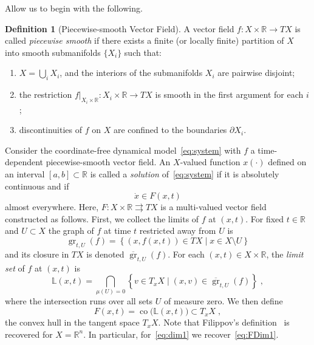 \documentclass{article}
\theoremstyle{definition}
\newtheorem{definition}{Definition}
\theoremstyle{remark}
\newcommand{\MA}{X}	%
\newcommand{\NE}{U}	%
\newcommand{\RR}{\mathbb{R}}	%
\DeclareMathOperator{\co}{co}
\DeclareMathOperator{\gr}{gr}
\begin{document}
Allow us to begin with the following.
\begin{definition}[Piecewise-smooth Vector Field]
 A vector field $f:\MA\times\RR \to T\MA$ is called \emph{piecewise smooth} if there exists 
 a finite (or locally finite) partition of $\MA$ into smooth submanifolds $\{\MA_i\}$ such that:
 \begin{enumerate}
  \item $\MA=\bigcup_i \MA_i$, and the interiors of the submanifolds $\MA_i$ are pairwise disjoint;
  \item the restriction $f\big|_{\MA_i \times \RR}: \MA_i \times \RR \to T\MA$ is smooth in the first argument for each $i$;
  \item discontinuities of $f$ on $\MA$ are confined to the boundaries $\partial \MA_i$.
 \end{enumerate}
\end{definition}

Consider the coordinate-free dynamical model~\eqref{eq:system} with $f$ a time-dependent
piecewise-smooth vector field. An $\MA$-valued function $x(\cdot)$ defined on an interval $[a,b] \subset \RR$ 
is called a \emph{solution} of~\eqref{eq:system} if it is absolutely continuous and if
\begin{equation} \label{eq:F}
 \dot{x} \in F(x,t)
\end{equation}
almost everywhere. Here, $F:\MA \times \RR \rightrightarrows T\MA$ is a multi-valued vector field constructed as follows.
First, we collect the limits of $f$ at $(x,t)$. For fixed $t \in \RR$ and $\NE \subset \MA$ the graph of $f$ at time $t$ restricted away from $\NE$ is
\begin{displaymath}
 \gr_{t,\NE}(f) = \left\{(x,f(x,t)) \in T\MA \mid x \in \MA\setminus\NE \right\}
\end{displaymath}
and its closure in $T\MA$ is denoted $\overline{\gr}_{t,\NE}(f)$. For each $(x,t) \in \MA \times \RR$,
the \emph{limit set} of $f$ at $(x,t)$ is
\begin{displaymath}
 \mathbb{L}(x,t) = \bigcap_{\mu(\NE) = 0} \left\{ v \in T_x \MA \mid (x,v) \in \overline{\gr}_{t,\NE}(f) \right\} \;,
\end{displaymath}
where the intersection runs over all sets $\NE$ of measure zero. We then define
\begin{equation} \label{eq:filippovConv}
  F(x,t) = \co\big(\mathbb{L}(x,t)\big) \subset T_x\MA \;,
\end{equation}
the convex hull in the tangent space $T_x\MA$. Note that Filippov's definition~\cite{filippov} is recovered for $\MA = \RR^n$.
In particular, for~\eqref{eq:dim1} we recover~\eqref{eq:FDim1}.
\end{document}
